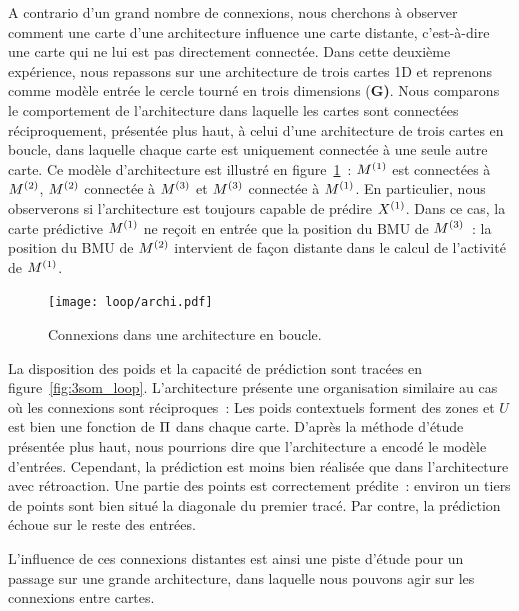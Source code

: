 \documentclass[../main]{subfiles}
\begin{document}
A contrario d'un grand nombre de connexions, nous cherchons à observer comment une carte d'une architecture influence une carte distante, c'est-à-dire une carte qui ne lui est pas directement connectée.
Dans cette deuxième expérience, nous repassons sur une architecture de trois cartes 1D et reprenons comme modèle entrée le cercle tourné en trois dimensions (\textbf{G)}. 
Nous comparons le comportement de l'architecture dans laquelle les cartes sont connectées réciproquement, présentée plus haut, à celui d'une architecture de trois cartes en boucle, dans laquelle chaque carte est uniquement connectée à une seule autre carte. Ce modèle d'architecture est illustré en figure~\ref{fig:archi_loop}~: $M^{({1})}$ est connectées à $M^{({2})}$, $M^{({2})}$ connectée à $M^{({3})}$ et $M^{({3})}$ connectée à $M^{({1})}$.
En particulier, nous observerons si l'architecture est toujours capable de prédire $X^{({1})}$. Dans ce cas, la carte prédictive $M^{({1})}$ ne reçoit en entrée que la position du BMU de $M^{({3})}$~: la position du BMU de $M^{({2})}$ intervient de façon distante dans le calcul de l'activité de $M^{({1})}$. 

\begin{figure}[h!]
	\centering\texttt{[image: loop/archi.pdf]}
	\caption{Connexions dans une architecture en \og boucle\fg{}. \label{fig:archi_loop}}
\end{figure}

La disposition des poids et la capacité de prédiction sont tracées en figure~\ref{fig:3som_loop}.
L'architecture présente une organisation similaire au cas où les connexions sont réciproques~: Les poids contextuels forment des zones et $U$ est bien une fonction de $\Pi$ dans chaque carte. 
D'après la méthode d'étude présentée plus haut, nous pourrions dire que l'architecture a encodé le modèle d'entrées.
Cependant, la prédiction est moins bien réalisée que dans l'architecture avec rétroaction. 
Une partie des points est correctement prédite~: environ un tiers de points sont bien situé la diagonale du premier tracé.
Par contre, la prédiction échoue sur le reste des entrées. 


L'influence de ces connexions distantes est ainsi une piste d'étude pour un passage sur une grande architecture, dans laquelle nous pouvons agir sur les connexions entre cartes.
\end{document}
